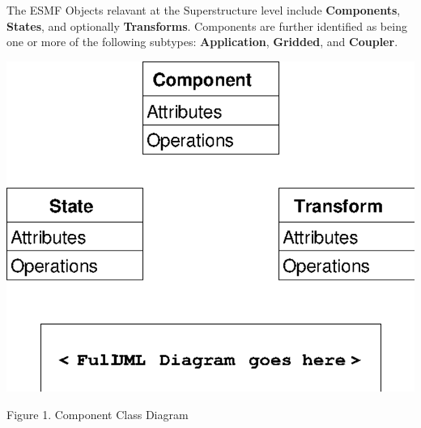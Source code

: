 %


The ESMF Objects relavant at the Superstructure level include
{\bf Components}, {\bf States}, and optionally {\bf Transforms}.
Components are further identified as being one or more of the following
subtypes: {\bf Application}, {\bf Gridded}, and {\bf Coupler}.

\begin{center}

\includegraphics{comp_obj.eps}
   
Figure 1.  Component Class Diagram
   
\end{center}
